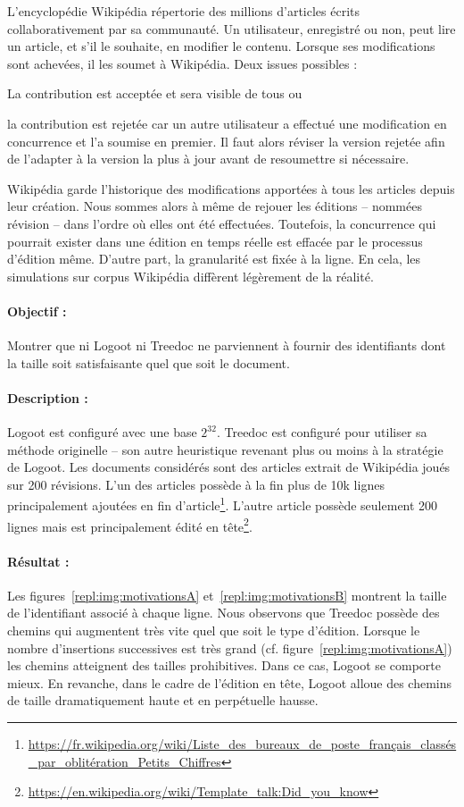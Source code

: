 L'encyclopédie Wikipédia répertorie des millions d'articles écrits
collaborativement par sa communauté. Un utilisateur, enregistré ou non, peut
lire un article, et s'il le souhaite, en modifier le contenu. Lorsque ses
modifications sont achevées, il les soumet à Wikipédia. Deux issues possibles :
\begin{inparaenum}[(i)]
\item La contribution est acceptée et sera visible de tous ou
\item la contribution est rejetée car un autre utilisateur a effectué une
  modification en concurrence et l'a soumise en premier. Il faut alors réviser
  la version rejetée afin de l'adapter à la version la plus à jour avant de
  resoumettre si nécessaire.
\end{inparaenum}
Wikipédia garde l'historique des modifications apportées à tous les articles
depuis leur création. Nous sommes alors à même de rejouer les éditions --
nommées révision -- dans l'ordre où elles ont été effectuées. Toutefois, la
concurrence qui pourrait exister dans une édition en temps réelle est effacée
par le processus d'édition même. D'autre part, la granularité est fixée à la
ligne. En cela, les simulations sur corpus Wikipédia diffèrent légèrement de la
réalité.

\paragraph{Objectif :} Montrer que ni Logoot ni Treedoc ne parviennent à fournir
des identifiants dont la taille soit satisfaisante quel que soit le document.

\paragraph{Description :} Logoot est configuré avec une base $2^{32}$. Treedoc
est configuré pour utiliser sa méthode originelle -- son autre heuristique
revenant plus ou moins à la stratégie de Logoot. Les documents considérés sont
des articles extrait de Wikipédia joués sur 200 révisions. L'un des articles
possède à la fin plus de 10k lignes principalement ajoutées en fin
d'article\footnote{\url{https://fr.wikipedia.org/wiki/Liste_des_bureaux_de_poste_français_classés_par_oblitération_Petits_Chiffres}}. L'autre
article possède seulement 200 lignes mais est principalement édité en
tête\footnote{\url{https://en.wikipedia.org/wiki/Template_talk:Did_you_know}}.

\paragraph{Résultat :} Les figures~\ref{repl:img:motivationsA}
et~\ref{repl:img:motivationsB} montrent la taille de l'identifiant associé à
chaque ligne. Nous observons que Treedoc possède des chemins qui augmentent très
vite quel que soit le type d'édition. Lorsque le nombre d'insertions successives
est très grand (cf. figure~\ref{repl:img:motivationsA}) les chemins atteignent
des tailles prohibitives. Dans ce cas, Logoot se comporte mieux. En revanche,
dans le cadre de l'édition en tête, Logoot alloue des chemins de taille
dramatiquement haute et en perpétuelle hausse.

